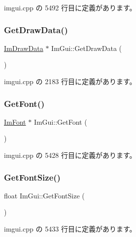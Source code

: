  imgui.\+cpp の 5492 行目に定義があります。

\mbox{\label{namespace_im_gui_ab73131dc44b1267dac04f0c2bb0af983}} 
\subsubsection{\texorpdfstring{Get\+Draw\+Data()}{GetDrawData()}}
{\footnotesize\ttfamily \mbox{\hyperlink{struct_im_draw_data}{Im\+Draw\+Data}} $\ast$ Im\+Gui\+::\+Get\+Draw\+Data (\begin{DoxyParamCaption}{ }\end{DoxyParamCaption})}



 imgui.\+cpp の 2183 行目に定義があります。

\mbox{\label{namespace_im_gui_a43cf349576e20fac4a1300269320ad8f}} 
\subsubsection{\texorpdfstring{Get\+Font()}{GetFont()}}
{\footnotesize\ttfamily \mbox{\hyperlink{struct_im_font}{Im\+Font}} $\ast$ Im\+Gui\+::\+Get\+Font (\begin{DoxyParamCaption}{ }\end{DoxyParamCaption})}



 imgui.\+cpp の 5428 行目に定義があります。

\mbox{\label{namespace_im_gui_ac592ae8e0aa4a1a06502ec7872bc8da8}} 
\subsubsection{\texorpdfstring{Get\+Font\+Size()}{GetFontSize()}}
{\footnotesize\ttfamily float Im\+Gui\+::\+Get\+Font\+Size (\begin{DoxyParamCaption}{ }\end{DoxyParamCaption})}



 imgui.\+cpp の 5433 行目に定義があります。


